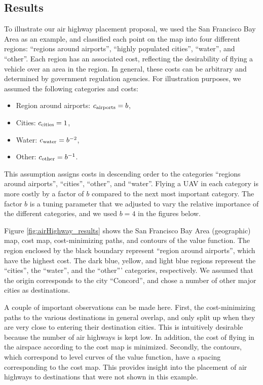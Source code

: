 \subsection{Results}
To illustrate our air highway placement proposal, we used the San Francisco Bay Area as an example, and classified each point on the map into four different regions: ``regions around airports'', ``highly populated cities'', ``water'', and ``other''. Each region has an associated cost, reflecting the desirability of flying a vehicle over an area in the region. In general, these costs can be arbitrary and determined by government regulation agencies. For illustration purposes, we assumed the following categories and costs:

\begin{itemize}
\item Region around airports: $c_\text{airports}=b$,
\item Cities: $c_\text{cities}=1$,
\item Water: $c_\text{water}=b^{-2}$,
\item Other: $c_\text{other}=b^{-1}$.
\end{itemize}

This assumption assigns costs in descending order to the categories ``regions around airports'', ``cities'', ``other'', and ``water''. Flying a UAV in each category is more costly by a factor of $b$ compared to the next most important category. The factor $b$ is a tuning parameter that we adjusted to vary the relative importance of the different categories, and we used $b=4$ in the figures below.

Figure \ref{fig:airHighway_results} shows the San Francisco Bay Area (geographic) map, cost map, cost-minimizing paths, and contours of the value function. The region enclosed by the black boundary represent ``region around airports'', which have the highest cost. The dark blue, yellow, and light blue regions represent the ``cities'', the ``water'', and the ``other''' categories, respectively. We assumed that the origin corresponds to the city ``Concord'', and chose a number of other major cities as destinations.

A couple of important observations can be made here. First, the cost-minimizing paths to the various destinations in general overlap, and only split up when they are very close to entering their destination cities. This is intuitively desirable because the number of air highways is kept low. In addition, the cost of flying in the airspace according to the cost map is minimized. Secondly, the contours, which correspond to level curves of the value function, have a spacing corresponding to the cost map. This provides insight into the placement of air highways to destinations that were not shown in this example.

